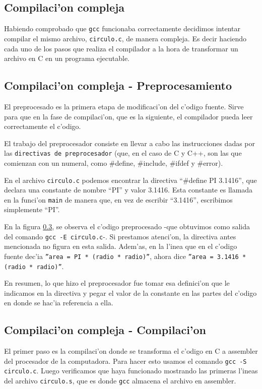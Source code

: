 \documentclass[11pt]{article}
\begin{document}
	\subsection{Compilaci'on compleja}
		Habiendo comprobado que \texttt{gcc} funcionaba correctamente decidimos intentar compilar el mismo archivo, \texttt{circulo.c}, de manera compleja. Es decir haciendo cada uno de los pasos que realiza el compilador a la hora de transformar un archivo en C en un programa ejecutable.
	
	\subsection{Compilaci'on compleja - Preprocesamiento}
		 El preprocesado es la primera etapa de modificaci'on del c'odigo fuente. Sirve para que en la fase de compilaci'on, que es la siguiente, el compilador pueda leer correctamente el c'odigo. 

    
    		El trabajo del preprocesador consiste en llevar a cabo las instrucciones dadas por las \texttt{directivas de preprocesador} (que, en el caso de C y C++, son las que comienzan con un numeral, como \#define, \#include, \#ifdef y \#error).

   		En el archivo \texttt{circulo.c} podemos encontrar la directiva  ``\#define PI 3.1416'', que declara %
    una constante de nombre  ``PI'' y valor 3.1416. Esta constante es llamada en la funci'on \texttt{main} de manera que, en vez de escribir  ``3.1416'', escribimos simplemente  ``PI''.

	    	En la figura \ref{}, %
    		se observa el c'odigo preprocesado -que obtuvimos como salida del comando \texttt{gcc -E circulo.c}-. Si prestamos atenci'on, la directiva antes mencionada no figura en esta salida. Adem'as, en la l'inea que en el c'odigo fuente dec'ia \texttt{''area = PI * (radio * radio)''}, ahora dice \texttt{''area = 3.1416 * (radio * radio)''}. 

   		En resumen, lo que hizo el preprocesador fue tomar esa definici'on que le indicamos en la directiva y pegar el valor de la constante en las partes del c'odigo en donde se hac'ia referencia a ella.

	\subsection{Compilaci'on compleja - Compilaci'on}
		El primer paso es la compilaci'on donde se transforma el c'odigo en C a assembler del procesador de la computadora. Para hacer esto usamos el comando \texttt{gcc -S circulo.c}. Luego verificamos que haya funcionado mostrando las primeras l'ineas del archivo \texttt{circulo.s}, que es donde \texttt{gcc} almacena el archivo en assembler.
\end{document}
